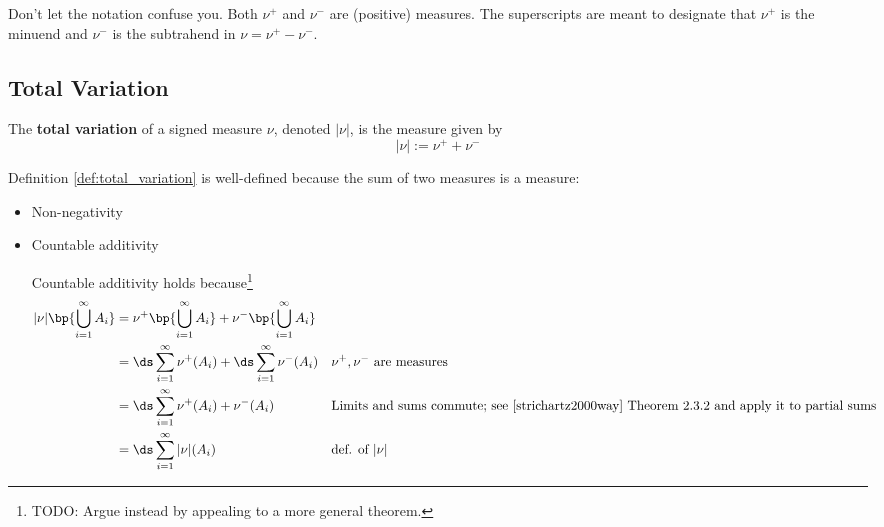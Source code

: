 \documentclass{article} %
\begin{document}
\begin{remark}
Don't let the notation confuse you.   Both $\nu^+$ and $\nu^-$ are (positive) measures.  The superscripts are meant to designate that $\nu^+$ is the minuend and  $\nu^-$  is the subtrahend in $\nu = \nu^+ - \nu^-$.	
\end{remark}


\subsection{Total Variation}

\begin{definition}
The \textbf{total variation} of a signed measure $\nu$, denoted $|\nu|$, is the measure given by 
\[ |\nu| := \nu^+ + \nu^- \]
\label{def:total_variation}	
\end{definition}

\begin{remark}
Definition \ref{def:total_variation} is well-defined because the sum of two measures is a measure:
\begin{itemize}
\item Non-negativity \checkmark 
\item Countable additivity \checkmark 

{\tiny Countable additivity holds because\footnote{TODO: Argue instead by appealing to a more general theorem.} 
\begin{align*}
|\nu|\bp{\bigcup_{i=1}^\infty A_i} &= \nu^+ \bp{\bigcup_{i=1}^\infty A_i}   + \nu^- \bp{\bigcup_{i=1}^\infty A_i}  \\
&= \ds\sum_{i=1}^\infty  \nu^+ (A_i) + \ds\sum_{i=1}^\infty  \nu^- (A_i) && \text{$\nu^+, \nu^-$ are measures} \\
&= \ds\sum_{i=1}^\infty \nu^+ (A_i) + \nu^-(A_i) && \text{Limits and sums commute; see \cite{strichartz2000way} Theorem 2.3.2 and apply it to partial sums} \\
&= \ds\sum_{i=1}^\infty |\nu|(A_i) && \text{def. of $|\nu|$}
\end{align*}

}	
\end{itemize}
	
\end{remark}
\end{document}
